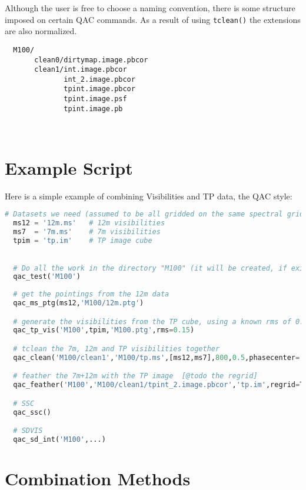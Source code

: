 \documentclass[12pt,a4paper]{article}
\begin{document}
Although the user is free to choose a naming convention, there is some structure imposed on certain QAC commands. As a result of using
\verb+tclean()+ the extensions are also normalized.

\begin{verbatim}
  M100/
       clean0/dirtymap.image.pbcor
       clean1/int.image.pbcor
              int_2.image.pbcor
              tpint.image.pbcor
              tpint.image.psf
              tpint.image.pb

       
\end{verbatim}


\section{Example Script}

Here is a simple example of combining Visibilities and TP data, the QAC style:

\begin{lstlisting}[language=Python]
  # Datasets we need (assumed to be all gridded on the same spectral grid)
  ms12 = '12m.ms'   # 12m visibilities
  ms7  = '7m.ms'    # 7m visibilities
  tpim = 'tp.im'    # TP image cube

  
  # Do all the work in the directory "M100" (it will be created, if exists, all contents removed)
  qac_test('M100')
  
  # get the pointings from the 12m data
  qac_ms_ptg(ms12,'M100/12m.ptg')

  # generate the visibilities from the TP cube, using a known rms of 0.15 Jy/beam in the TP cube
  qac_tp_vis('M100',tpim,'M100.ptg',rms=0.15)

  # tclean the 7m, 12m and TP visibilities together
  qac_clean('M100/clean1','M100/tp.ms',[ms12,ms7],800,0.5,phasecenter='J2000 12h22m54.900s +15d49m15.000s',niter=[0,10000])

  # feather the 7m+12m with the TP image  [@todo the regrid]
  qac_feather('M100','M100/clean1/tpint_2.image.pbcor','tp.im',regrid=True)

  # SSC
  qac_ssc()

  # SDVIS
  qac_sd_int('M100',...)

\end{lstlisting}


\section{Combination Methods}
\end{document}
